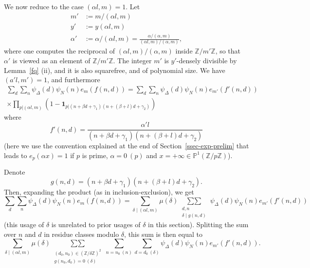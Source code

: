 \documentclass[12pt,a4paper,reqno]{amsart}
\numberwithin{equation}{section}
\theoremstyle{plain}
\theoremstyle{definition}
\newcommand\Z{\mathbb{Z}}
\renewcommand\P{\mathbb{P}}
\newcommand\sumsum{\mathop{\sum\sum}\limits}
\renewcommand{\lessapprox}{\llcurly}
\newcommand{\onef}{\mathbf{1}}
\begin{document}
We now reduce to the case $(\alpha l,m)=1$. Let
\begin{align*}
  m' &:= m / (\alpha l,m)\\
  y' &:= y (\alpha l,m)\\
  \alpha' &:= \alpha/(\alpha l,m) = \frac{\alpha/(\alpha,m)}{(\alpha
    l,m)/(\alpha,m)},
\end{align*}
where one computes the reciprocal of $(\alpha l,m)/(\alpha,m)$ inside
$\Z/m'\Z$, so that $\alpha'$ is viewed as an element of $\Z/m'\Z$. The integer $m'$ is $y'$-densely
divisible by Lemma~\ref{fq} (ii), and it is also squarefree, and of
polynomial size. We have $(a'l,m')=1$, and furthermore
\begin{multline*}
  \sum_d \sum_n \psi_{\Delta}(d) \psi_N(n) e_m(f(n,d)) = \sum_d \sum_n
  \psi_{\Delta}(d) \psi_N(n) e_{m'}(f'(n,d))\\
  \times \prod_{p|(\alpha l,m)} (1 - \onef_{p | (n+\beta
    d+\gamma_1)(n+(\beta+l)d+\gamma_2)})
\end{multline*}
where
$$
f'(n,d)=\frac{\alpha' l}{(n+\beta d+\gamma_1)(n+(\beta+l)d+\gamma_2)}
$$
(here we use the convention explained at the end of
Section~\ref{ssec-exp-prelim} that leads to $e_p(\alpha x)=1$ if $p$
is prime, $\alpha=0\ (p)$ and $x=+\infty\in\P^1(\Z/p\Z)$).
\par
Denote
$$
g(n,d)= (n+\beta d+\gamma_1)(n+(\beta+l)d+\gamma_2).
$$
Then, expanding the product (as in inclusion-exclusion), we get
$$
\sum_d \sum_n \psi_{\Delta}(d) \psi_N(n) e_m(f(n,d)) =
\sum_{\delta\mid (\alpha l,m)} \mu(\delta) \sumsum_{\substack{d,n\\
    \delta\mid g(n,d)}}\psi_{\Delta}(d)\psi_N(n) e_{m'}(f'(n,d))
$$
(this usage of $\delta$ is unrelated to prior usages of $\delta$ in this section).
Splitting the sum over $n$ and $d$ in residue classes modulo $\delta$,
this sum is then equal to
$$
\sum_{\delta\mid (\alpha l,m)}\mu(\delta)
\sumsum_{\substack{(d_0,n_0)\in(\Z/\delta\Z)^2\\g(n_0,d_0)=0\
    (\delta)}} \sum_{n=n_0\ (n)} \sum_{d=d_0\
  (\delta)}\psi_{\Delta}(d)\psi_N(n) e_{m'}(f'(n,d)).
$$
\end{document}
